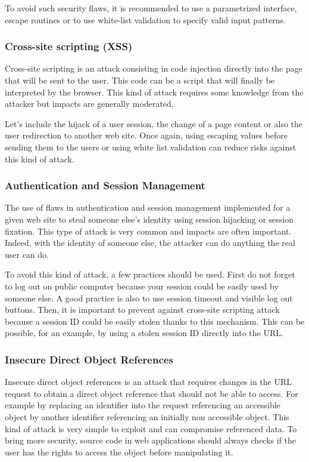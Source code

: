 To avoid such security flaws, it is recommended to use a parametrized
interface, escape routines or to use white-list validation to specify valid
input patterns.


\subsubsection{Cross-site scripting (XSS)}
Cross-site scripting is an attack consisting in code injection directly into the
page that will be sent to the user. This code can be a script that will finally
be interpreted by the browser. This kind of attack requires some knowledge from
the attacker but impacts are generally moderated.


Let's include the hijack of a user session, the change of a page content or
also the user redirection to another web site. Once again, using escaping
values before sending them to the users or using white list validation can
reduce risks against this kind of attack.


\subsubsection{Authentication and Session Management}
The use of flaws in authentication and session management
implemented for a given web site to steal someone else's identity using
session hijacking or session fixation. This type of attack is very
common and impacts are often important. Indeed, with the identity of someone
else, the attacker can do anything the real user can do.

To avoid this kind of attack, a few practices should be used. First do not
forget to log out on public computer because your session could be easily used
by someone else. A good practice is also to use session timeout and visible
log out buttons. Then, it is important to prevent against cross-site scripting
attack because a session ID could be easily stolen thanks to this mechanism.
This can be possible, for an example, by using a stolen session ID directly
into the URL.

\subsubsection{Insecure Direct Object References}
Insecure direct object references is an attack that requires changes in the URL
request to obtain a direct object reference that should not be able to access.
For example by replacing an identifier into the request referencing an
accessible object by another identifier referencing an initially non accessible
object. This kind of attack is very simple to exploit and can compromise
referenced data. To bring more security, source code in web applications should
always checks if the user has the rights to access the object before
manipulating it.

